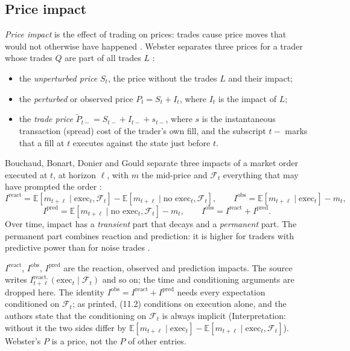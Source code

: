 \subsection{Price impact}

\begin{qfdefinition}\label{def:price-impact}
 \emph{Price impact} is the effect of trading on prices: trades cause price moves that would not otherwise have happened \citep[chap.~1, sec.~1.1.2, p.~5]{wide-webster-price-impact}. Webster separates three prices for a trader whose trades $Q$ are part of all trades $L$ \citep[chap.~2, Definition~2.2.6, pp.~53--54]{wide-webster-price-impact}:
\begin{itemize}
\item the \emph{unperturbed price} $S_t$, the price without the trades $L$ and their impact;
\item the \emph{perturbed} or observed price $P_t=S_t+I_t$, where $I_t$ is the impact of $L$;
\item the \emph{trade price} $\widetilde P_{t-}=S_{t-}+I_{t-}+s_{t-}$, where $s$ is the instantaneous transaction (spread) cost of the trader's own fill, and the subscript $t-$ marks that a fill at $t$ executes against the state just before $t$.
\end{itemize}
Bouchaud, Bonart, Donier and Gould separate three impacts of a market order executed at $t$, at horizon $\ell$, with $m$ the mid-price and $\mathcal F_t$ everything that may have prompted the order \citep[chap.~11, sec.~11.2, eqs.~(11.1)--(11.4), pp.~210--211]{catalogue-0528}:
\[ I^{\mathrm{react}}=\mathbb E[m_{t+\ell}\mid\mathrm{exec}_t,\mathcal F_t]-\mathbb E[m_{t+\ell}\mid\text{no exec}_t,\mathcal F_t],\qquad I^{\mathrm{obs}}=\mathbb E[m_{t+\ell}\mid\mathrm{exec}_t]-m_t, \]
\[ I^{\mathrm{pred}}=\mathbb E[m_{t+\ell}\mid\text{no exec}_t,\mathcal F_t]-m_t,\qquad I^{\mathrm{obs}}=I^{\mathrm{react}}+I^{\mathrm{pred}}. \]
Over time, impact has a \emph{transient} part that decays and a \emph{permanent} part. The permanent part combines reaction and prediction: it is higher for traders with predictive power than for noise trades \citep[chap.~12, sec.~12.4, p.~240]{catalogue-0528}.

 $I^{\mathrm{react}}$, $I^{\mathrm{obs}}$, $I^{\mathrm{pred}}$ are the reaction, observed and prediction impacts. The source writes $I^{\mathrm{react.}}_{t+\ell}(\mathrm{exec}_t\mid\mathcal F_t)$ and so on; the time and conditioning arguments are dropped here. The identity $I^{\mathrm{obs}}=I^{\mathrm{react}}+I^{\mathrm{pred}}$ needs every expectation conditioned on $\mathcal F_t$; as printed, (11.2) conditions on execution alone, and the authors state that the conditioning on $\mathcal F_t$ is always implicit \citep[same sec., p.~210]{catalogue-0528} (Interpretation: without it the two sides differ by $\mathbb E[m_{t+\ell}\mid\mathrm{exec}_t]-\mathbb E[m_{t+\ell}\mid\mathrm{exec}_t,\mathcal F_t]$). Webster's $P$ is a price, not the $P$ of other entries.


\end{qfdefinition}
